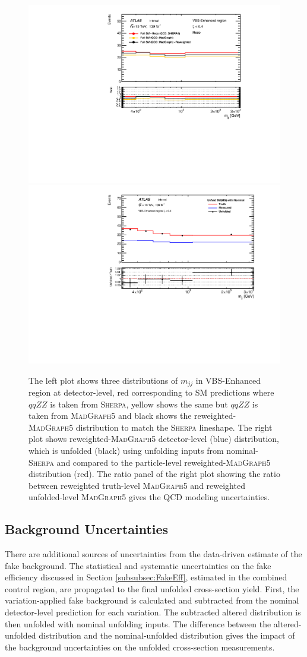 \begin{itemize}
{    \begin{figure}
        \centering
        \includegraphics[width=.48\linewidth]{figures/Analysis/Systematics/QCDmodel_Dist.pdf}
        \includegraphics[width=.48\linewidth]{figures/Analysis/Systematics/QCDmodel_Unc.pdf}
        \caption{The left plot shows three distributions of $m_{jj}$ in VBS-Enhanced region at detector-level, red corresponding to SM predictions where $qqZZ$ is taken from \textsc{Sherpa}, yellow shows the same but $qqZZ$ is taken from \textsc{MadGraph5} and black shows the reweighted-\textsc{MadGraph5} distribution to match the \textsc{Sherpa} lineshape. The right plot shows reweighted-\textsc{MadGraph5} detector-level (blue) distribution, which is unfolded (black) using unfolding inputs from nominal-\textsc{Sherpa} and compared to the particle-level reweighted-\textsc{MadGraph5} distribution (red). The ratio panel of the right plot showing the ratio between reweighted truth-level \textsc{MadGraph5} and reweighted unfolded-level \textsc{MadGraph5} gives the QCD modeling uncertainties. \label{fig:QCDModelUnc}}
 \end{figure}  

    }
\end{itemize}

\subsection{Background Uncertainties}
\label{subsec:BkgUnc}
There are additional sources of uncertainties from the data-driven estimate of the fake background. The statistical and systematic uncertainties on the fake efficiency discussed in Section \ref{subsubsec:FakeEff}, estimated in the combined control region, are propagated to the final unfolded cross-section yield. First, the variation-applied fake background is calculated and subtracted from the nominal detector-level prediction for each variation. The subtracted altered distribution is then unfolded with nominal unfolding inputs. The difference between the altered-unfolded distribution and the nominal-unfolded distribution gives the impact of the background uncertainties on the unfolded cross-section measurements.

